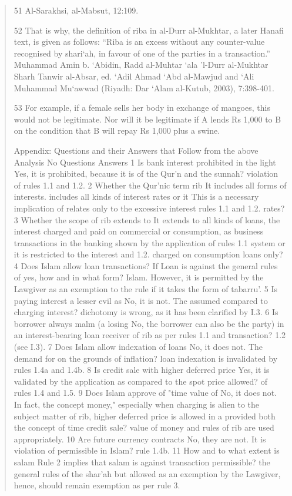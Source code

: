 \begin{quote}
51 Al-Sarakhsi, al-Mabsut, 12:109.

52 That is why, the definition of riba in al-Durr al-Mukhtar, a later Hanafi text, is given as follows: “Riba is an excess without any counter-value recognised by shari‘ah, in favour of one of the parties in a transaction.” Muhammad Amin b. ‘Abidin, Radd al-Muhtar ‘ala 'l-Durr al-Mukhtar Sharh Tanwir al-Absar, ed. ‘Adil Ahmad ‘Abd al-Mawjud and ‘Ali Muhammad Mu‘awwad (Riyadh: Dar ‘Alam al-Kutub, 2003), 7:398-401.

53 For example, if a female sells her body in exchange of mangoes, this would not be legitimate. Nor will it be legitimate if A lends Rs 1,000 to B on the condition that B will repay Rs 1,000 plus a swine.

Appendix: Questions and their Answers that Follow from the above Analysis No Questions Answers 1 Is bank interest prohibited in the light Yes, it is prohibited, because it is of the Qur'n and the sunnah? violation of rules 1.1 and 1.2. 2 Whether the Qur'nic term rib It includes all forms of interests. includes all kinds of interest rates or it This is a necessary implication of relates only to the excessive interest rules 1.1 and 1.2. rates? 3 Whether the scope of rib extends to It extends to all kinds of loans, the interest charged and paid on commercial or consumption, as business transactions in the banking shown by the application of rules 1.1 system or it is restricted to the interest and 1.2. charged on consumption loans only? 4 Does Islam allow loan transactions? If Loan is against the general rules of yes, how and in what form? Islam. However, it is permitted by the Lawgiver as an exemption to the rule if it takes the form of tabarru'. 5 Is paying interest a lesser evil as No, it is not. The assumed compared to charging interest? dichotomy is wrong, as it has been clarified by I.3. 6 Is borrower always malm (a losing No, the borrower can also be the party) in an interest-bearing loan receiver of rib as per rules 1.1 and transaction? 1.2 (see I.3). 7 Does Islam allow indexation of loans No, it does not. The demand for on the grounds of inflation? loan indexation is invalidated by rules 1.4a and 1.4b. 8 Is credit sale with higher deferred price Yes, it is validated by the application as compared to the spot price allowed? of rules 1.4 and 1.5. 9 Does Islam approve of "time value of No, it does not. In fact, the concept money," especially when charging is alien to the subject matter of rib, higher deferred price is allowed in a provided both the concept of time credit sale? value of money and rules of rib are used appropriately. 10 Are future currency contracts No, they are not. It is violation of permissible in Islam? rule 1.4b. 11 How and to what extent is salam Rule 2 implies that salam is against transaction permissible? the general rules of the shar'ah but allowed as an exemption by the Lawgiver, hence, should remain exemption as per rule 3.
 \end{quote}
 
